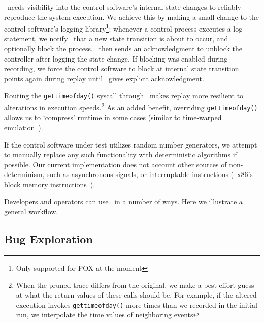 \projectname~needs visibility into the control software's internal state
changes to reliably reproduce the system execution. We achieve this by
making a
small change to the control software's logging library\footnote{Only supported
for POX at the moment}: whenever a control process executes a log
statement, we notify \projectname~that a new state transition
is about to occur, and optionally block the process. \projectname~then sends
an acknowledgment to unblock the controller after logging the state change. If blocking was enabled
during recording, we force the control software to block at internal state
transition points again during replay
until \projectname~gives explicit acknowledgment.

Routing the {\tt gettimeofday()} syscall
through \projectname~makes replay more resilient to alterations in execution
speeds.\footnote{When the pruned trace differs from the original, we make a
best-effort guess at what the return values of these calls should be. For example,
if the altered execution invokes {\tt gettimeofday()} more times than we recorded
in the initial run, we interpolate the time values of neighboring events}
As an added benefit, overriding {\tt gettimeofday()} allows us to `compress'
runtime in some cases (similar to time-warped emulation~\cite{Gupta06toinfinity}).

If the control software under test utilizes random number generators, we
attempt to manually replace any such functionality with deterministic
algorithms if possible. Our current implementation does not account other sources of non-determinism,
such as asynchronous signals,
or interruptable instructions (\eg~x86's block memory
instructions~\cite{Dunlap:2002:REI:844128.844148}).


Developers and operators can use \projectname~in a number of ways. Here we
illustrate a general workflow.

\subsection{Bug Exploration}
\label{subsec:exploration}

